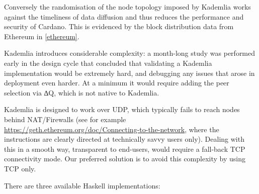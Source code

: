 \documentclass[11pt,a4paper]{article}
\begin{document}
Conversely the randomisation of the node topology imposed by Kademlia
works against the timeliness of data diffusion and thus reduces the
performance and security of Cardano. This is evidenced by the block
distribution data from Ethereum in \cref{ethereum}.

Kademlia introduces considerable complexity: a month-long study was
performed early in the design cycle that concluded that validating a
Kademlia implementation would be extremely hard, and debugging any
issues that arose in deployment even harder. At a minimum it would
require adding the peer selection via ∆Q, which is not native to
Kademlia.

Kademlia is designed to work over UDP, which typically fails to reach
nodes behind NAT/Firewalls (see for example
\href{https://geth.ethereum.org/doc/Connecting-to-the-network}{{https://geth.ethereum.org/doc/Connecting-to-the-network}},
where the instructions are clearly directed at technically savvy users
only). Dealing with this in a smooth way, transparent to end-users,
would require a fall-back TCP connectivity mode. Our preferred solution
is to avoid this complexity by using TCP only.

There are three available Haskell implementations:
\end{document}
